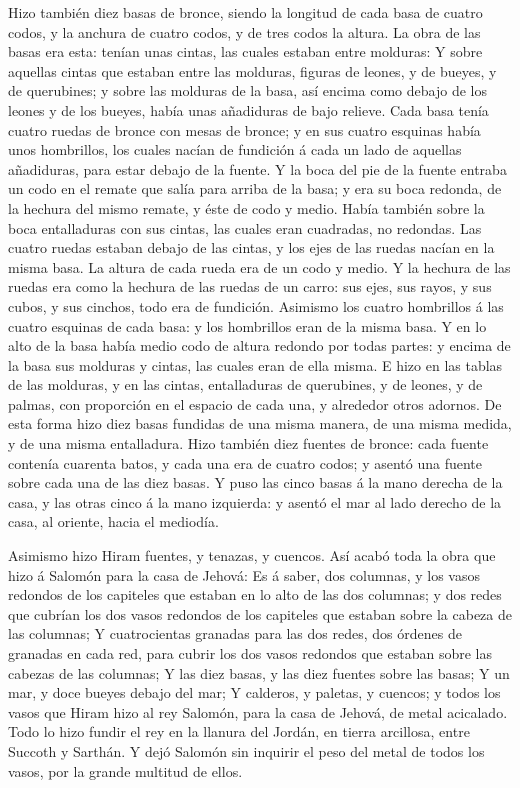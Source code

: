  Hizo también diez basas de bronce, siendo la longitud de
cada basa de cuatro codos, y la anchura de cuatro codos, y de tres codos
la altura.  La obra de las basas era esta: tenían unas
cintas, las cuales estaban entre molduras:  Y sobre
aquellas cintas que estaban entre las molduras, figuras de leones, y de
bueyes, y de querubines; y sobre las molduras de la basa, así encima
como debajo de los leones y de los bueyes, había unas añadiduras de bajo
relieve.  Cada basa tenía cuatro ruedas de bronce con mesas
de bronce; y en sus cuatro esquinas había unos hombrillos, los cuales
nacían de fundición á cada un lado de aquellas añadiduras, para estar
debajo de la fuente.  Y la boca del pie de la fuente
entraba un codo en el remate que salía para arriba de la basa; y era su
boca redonda, de la hechura del mismo remate, y éste de codo y medio.
Había también sobre la boca entalladuras con sus cintas, las cuales eran
cuadradas, no redondas.  Las cuatro ruedas estaban debajo
de las cintas, y los ejes de las ruedas nacían en la misma basa. La
altura de cada rueda era de un codo y medio.  Y la hechura
de las ruedas era como la hechura de las ruedas de un carro: sus ejes,
sus rayos, y sus cubos, y sus cinchos, todo era de fundición.
 Asimismo los cuatro hombrillos á las cuatro esquinas de
cada basa: y los hombrillos eran de la misma basa.  Y en lo
alto de la basa había medio codo de altura redondo por todas partes: y
encima de la basa sus molduras y cintas, las cuales eran de ella misma.
 E hizo en las tablas de las molduras, y en las cintas,
entalladuras de querubines, y de leones, y de palmas, con proporción en
el espacio de cada una, y alrededor otros adornos.  De esta
forma hizo diez basas fundidas de una misma manera, de una misma medida,
y de una misma entalladura.  Hizo también diez fuentes de
bronce: cada fuente contenía cuarenta batos, y cada una era de cuatro
codos; y asentó una fuente sobre cada una de las diez basas.
 Y puso las cinco basas á la mano derecha de la casa, y las
otras cinco á la mano izquierda: y asentó el mar al lado derecho de la
casa, al oriente, hacia el mediodía.

 Asimismo hizo Hiram fuentes, y tenazas, y cuencos. Así
acabó toda la obra que hizo á Salomón para la casa de Jehová:
 Es á saber, dos columnas, y los vasos redondos de los
capiteles que estaban en lo alto de las dos columnas; y dos redes que
cubrían los dos vasos redondos de los capiteles que estaban sobre la
cabeza de las columnas;  Y cuatrocientas granadas para las
dos redes, dos órdenes de granadas en cada red, para cubrir los dos
vasos redondos que estaban sobre las cabezas de las columnas;
 Y las diez basas, y las diez fuentes sobre las basas;
 Y un mar, y doce bueyes debajo del mar;  Y
calderos, y paletas, y cuencos; y todos los vasos que Hiram hizo al rey
Salomón, para la casa de Jehová, de metal acicalado.  Todo
lo hizo fundir el rey en la llanura del Jordán, en tierra arcillosa,
entre Succoth y Sarthán.  Y dejó Salomón sin inquirir el
peso del metal de todos los vasos, por la grande multitud de ellos.

